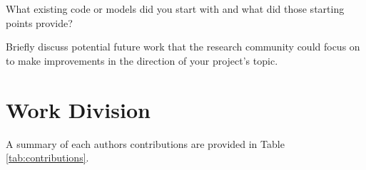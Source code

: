 \documentclass[10pt,twocolumn,letterpaper]{article}
\begin{document}
What existing code or models did you start with and what did those starting points provide? 

Briefly discuss potential future work that the research community could focus on to make improvements in the direction of your project's topic.



\section{Work Division}

A summary of each authors contributions are provided in Table \ref{tab:contributions}.








\end{document}

